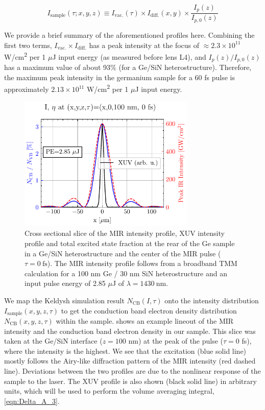 \begin{equation}
I_{\textrm{sample}}(\tau; x, y, z) \equiv I_{\textrm{vac.}}(\tau) \times I_{\textrm{diff.}}(x, y) \times \frac{I_p(z)}{I_{p,0}(z)}
\label{eqn:sample_intensity_XYZtau}
\end{equation}

We provide a brief summary of the aforementioned profiles here. Combining the first two terms, $I_{\textrm{vac.}} \times I_{\textrm{diff.}}$ has a peak intensity at the focus of $\approx 2.3 \times 10^{11}$ W/cm\textsuperscript{2} per 1 $\mu$J input energy (as measured before lens L4), and $I_p(z) / I_{p,0}(z)$ has a maximum value of about 93\% (for a Ge/SiN heterostructure). Therefore, the maximum peak intensity in the germanium sample for a 60 fs pulse is approximately $2.13 \times 10^{11}$ W/cm\textsuperscript{2} per 1 $\mu$J input energy.

\begin{figure}
	\centering
	\includegraphics[width=0.75\textwidth]{figures/chap4/excitation_at_focus.pdf}
	\caption{Cross sectional slice of the MIR intensity profile, XUV intensity profile and total excited state fraction at the rear of the Ge sample in a Ge/SiN heterostructure and the center of the MIR pulse ($\tau = 0 \ \textrm{fs}$). The MIR intensity profile follows from a broadband TMM calculation for a 100 nm Ge / 30 nm SiN heterostructure and an input pulse energy of {2.85 $\mu$J} of $\lambda = 1430 \ \textrm{nm}$.}
	\label{fig:excitation_at_focus}
\end{figure}

We map the Keldysh simulation result $N_{\textrm{CB}}(I, \tau)$ onto the intensity distribution $I_{\textrm{sample}}(x, y, z, \tau)$ to get the conduction band electron density distribution $N_{\textrm{CB}}(x, y, z, \tau)$ within the sample.  shows an example lineout of the MIR intensity and the conduction band electron density in our sample. This slice was taken at the Ge/SiN interface ($z=100$ nm) at the peak of the pulse ($\tau=0$ fs), where the intensity is the highest. We see that the excitation (blue solid line) mostly follows the Airy-like diffraction pattern of the MIR intensity (red dashed line). Deviations between the two profiles are due to the nonlinear response of the sample to the laser. The XUV profile is also shown (black solid line) in arbitrary units, which will be used to perform the volume averaging integral, \cref{eqn:Delta_A_3}.

